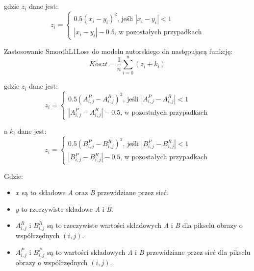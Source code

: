 \begin{enumerate}[leftmargin=*]
  \noindent
  gdzie $z_{i}$ dane jest:
  \begin{equation}
  z_{i} = \begin{cases}
               0.5(x_{i} - y_{i})^2 \text{, jeśli } |x_{i} - y_{i}| < 1 \\
               |x_{i} - y_{i}| - 0.5 \text{, w pozostałych przypadkach}
            \end{cases}
  \end{equation}

  \noindent
  Zastosowanie SmoothL1Loss do modelu autorskiego da następującą funkcję:
  \begin{equation}
  Koszt = \frac{1}{n}\sum_{i=0}^{n} (z_{i} + k_{i})
  \end{equation}

  \noindent
  gdzie $z_{i}$ dane jest:
  \begin{equation}
  z_{i} = \begin{cases}
               0.5(A_{i, j}^{P} - A_{i, j}^{R})^2 \text{, jeśli } |A_{i, j}^{P} - A_{i, j}^{R}| < 1 \\
               |A_{i, j}^{P} - A_{i, j}^{R}| - 0.5 \text{, w pozostałych przypadkach}
            \end{cases}
  \end{equation}

  \noindent
  a $k_{i}$ dane jest:
  \begin{equation}
  z_{i} = \begin{cases}
               0.5(B_{i, j}^{P} - B_{i, j}^{R})^2 \text{, jeśli } |B_{i, j}^{P} - B_{i, j}^{R}| < 1 \\
               |B_{i, j}^{P} - B_{i, j}^{R}| - 0.5 \text{, w pozostałych przypadkach}
            \end{cases}
  \end{equation}

  \end{enumerate}
  \noindent
  Gdzie:
  \begin{itemize}
    \item $x$ są to składowe \textit{A} oraz \textit{B} przewidziane przez sieć.
    \item $y$ to rzeczywiste składowe \textit{A} i \textit{B}.
    \item $A_{i, j}^{R}$ i $B_{i, j}^{R}$ są to rzeczywiste wartości składowych
    \textit{A} i \textit{B} dla pikselu obrazy o współrzędnych $(i, j)$.
    \item $A_{i, j}^{P}$ i $B_{i, j}^{P}$ są to wartości składowych
    \textit{A} i \textit{B} przewidziane przez sieć dla pikselu obrazy o
    współrzędnych $(i, j)$.
  \end{itemize}

